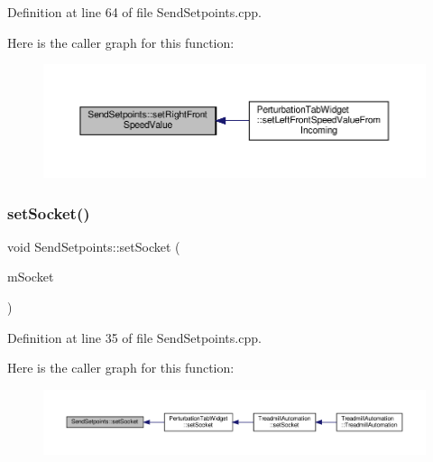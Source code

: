 Definition at line 64 of file Send\+Setpoints.\+cpp.

Here is the caller graph for this function\+:
\nopagebreak
\begin{figure}[H]
\begin{center}
\leavevmode
\includegraphics[width=350pt]{class_send_setpoints_ac4a206b4a1b4847749c817bcb473f3bc_icgraph}
\end{center}
\end{figure}
\mbox{\label{class_send_setpoints_a49070309da83f7bab87827915b0524f9}} 
\subsubsection{\texorpdfstring{set\+Socket()}{setSocket()}}
{\footnotesize\ttfamily void Send\+Setpoints\+::set\+Socket (\begin{DoxyParamCaption}\item[{Q\+Abstract\+Socket $\ast$}]{m\+Socket }\end{DoxyParamCaption})}



Definition at line 35 of file Send\+Setpoints.\+cpp.

Here is the caller graph for this function\+:
\nopagebreak
\begin{figure}[H]
\begin{center}
\leavevmode
\includegraphics[width=350pt]{class_send_setpoints_a49070309da83f7bab87827915b0524f9_icgraph}
\end{center}
\end{figure}
\mbox{\label{class_send_setpoints_acb1a31e0cd0938661034d3c1a4dad8c7}} 
